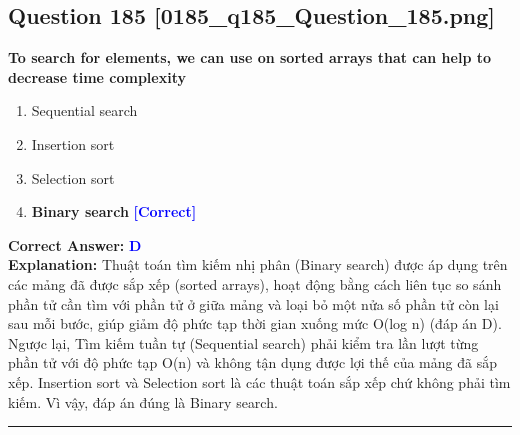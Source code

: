 \documentclass[11pt,a4paper]{article}
\begin{document}
\begin{minipage}{\textwidth}
\subsection*{Question 185 \quad \footnotesize{[0185\_q185\_Question\_185.png]}}
\noindent \textbf{To search for elements, we can use on sorted arrays that can help to decrease time complexity}

\begin{enumerate}[label=\Alph*.]
    \item Sequential search
    \item Insertion sort
    \item Selection sort
    \item \textbf{Binary search} \hfill \textcolor{blue}{\textbf{[Correct]}}
\end{enumerate}

\noindent \textbf{Correct Answer:} \textcolor{blue}{\textbf{D}} \\[2pt]
\noindent \textbf{Explanation:} Thuật toán tìm kiếm nhị phân (Binary search) được áp dụng trên các mảng đã được sắp xếp (sorted arrays), hoạt động bằng cách liên tục so sánh phần tử cần tìm với phần tử ở giữa mảng và loại bỏ một nửa số phần tử còn lại sau mỗi bước, giúp giảm độ phức tạp thời gian xuống mức O(log n) (đáp án D). Ngược lại, Tìm kiếm tuần tự (Sequential search) phải kiểm tra lần lượt từng phần tử với độ phức tạp O(n) và không tận dụng được lợi thế của mảng đã sắp xếp. Insertion sort và Selection sort là các thuật toán sắp xếp chứ không phải tìm kiếm. Vì vậy, đáp án đúng là Binary search.

\par\vspace{0.3cm}
\hrule
\vspace{0.3cm}
\end{minipage}
\end{document}
